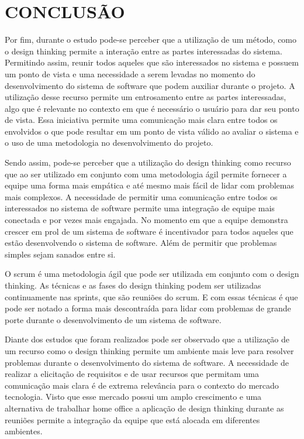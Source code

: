 \documentclass[a4paper,twoside]{article}
\begin{document}
\section{\uppercase{Conclusão}}

Por fim, durante o estudo pode-se perceber que a utilização de um método, como o design thinking permite a interação entre as partes interessadas do sistema. Permitindo assim, reunir todos aqueles que são interessados no sistema e possuem um ponto de vista e uma necessidade a serem levadas no momento do desenvolvimento do sistema de software que podem auxiliar durante o projeto.  A utilização desse recurso permite um entrosamento entre as partes interessadas, algo que é relevante no contexto em que é necessário o usuário para dar seu ponto de vista. Essa iniciativa permite uma comunicação mais clara entre todos os envolvidos o que pode resultar em um ponto de vista válido ao avaliar o sistema e o uso de uma metodologia no desenvolvimento do projeto.

Sendo assim, pode-se perceber que  a utilização do design thinking como recurso que ao ser utilizado em conjunto com uma metodologia ágil permite fornecer a equipe uma forma mais empática e até mesmo mais fácil de lidar com problemas mais  complexos. A necessidade de permitir uma comunicação entre todos os interessados no sistema de software permite uma integração de equipe mais conectada e por vezes mais engajada. No momento em que a equipe demonstra crescer em prol de um sistema de software é incentivador para todos aqueles que estão desenvolvendo o sistema de software. Além de permitir que problemas simples sejam sanados entre si.

O scrum é uma metodologia ágil que pode ser utilizada em conjunto com o design thinking. As técnicas e as fases do design thinking podem ser utilizadas continuamente nas sprints, que são reuniões do scrum. E com essas técnicas é que pode ser notado a forma mais descontraída para lidar com problemas de grande porte durante o desenvolvimento de um sistema de software.

Diante dos estudos que foram realizados pode ser observado que a utilização de um recurso como o design thinking permite um ambiente mais leve para resolver problemas durante o desenvolvimento do sistema de software. A necessidade de realizar a elicitação de requisitos e de usar recursos que permitam uma comunicação mais clara é de extrema relevância para o contexto do mercado tecnologia.
Visto que esse mercado possui um amplo crescimento e uma alternativa de trabalhar home office a aplicação de design thinking durante as reuniões permite a integração da equipe que está alocada em diferentes ambientes. 
\end{document}
